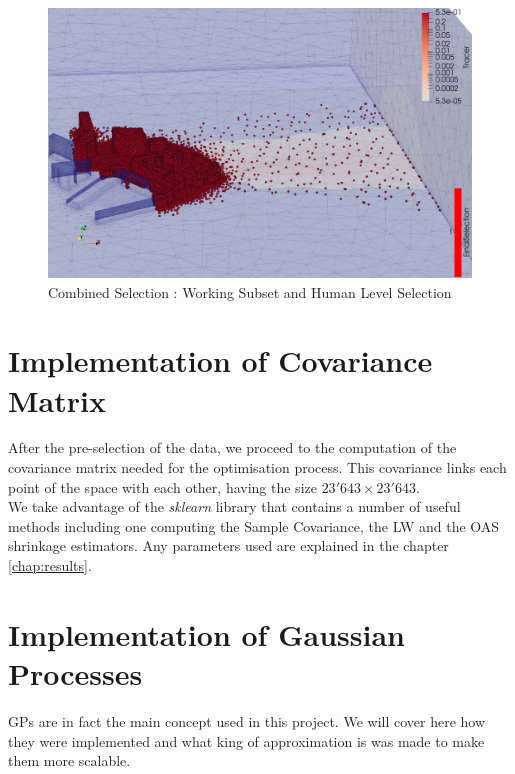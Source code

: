 \begin{figure}[h!]
\centering
	\includegraphics[width = 0.8 \linewidth]{figures/Subset/FinalSelection_zoom}
	\caption{Combined Selection : Working Subset and Human Level Selection}
	\label{fig:combined_selection}
\end{figure}


\section{Implementation of Covariance Matrix}

After the pre-selection of the data, we proceed to the computation of the covariance matrix needed for the optimisation process. This covariance links each point of the space with each other, having the size $23'643 \times 23'643 $.\\

We take advantage of the \textit{sklearn} library that contains a number of useful methods including one computing the Sample Covariance, the LW and the OAS shrinkage estimators. Any parameters used are explained in the chapter \ref{chap:results}. \\



\section{Implementation of Gaussian Processes}

GPs are in fact the main concept used in this project. We will cover here how they were implemented and what king of approximation is was made to make them more scalable. 



